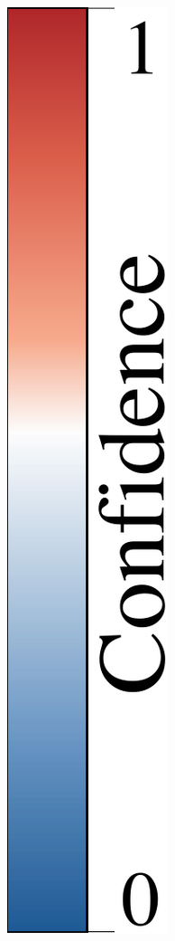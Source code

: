 \documentclass[runningheads]{llncs}%
\begin{document}
\begin{figure}
\begin{subfigure}[b]{.0255\textwidth}
        {\includegraphics[width=\textwidth]{figs/cbar/cbar_confidence.pdf}}     

\end{subfigure}
\end{figure}
\end{document}
